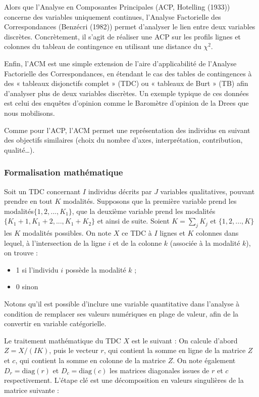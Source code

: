 \documentclass[12pt,a4paper]{reedthesis}
\providecommand{\tightlist}{%
  \setlength{\itemsep}{0pt}\setlength{\parskip}{0pt}}
\begin{document}
Alors que l'Analyse en Composantes Principales (ACP, Hotelling (1933)) concerne des variables uniquement continues, l'Analyse Factorielle des Correspondances (Benzécri (1982)) permet d'analyser le lien entre deux variables discrètes. Concrètement, il s'agit de réaliser une ACP sur les profils lignes et colonnes du tableau de contingence en utilisant une distance du \(\chi^2\).

Enfin, l'ACM est une simple extension de l'aire d'applicabilité de l'Analyse Factorielle des Correspondances, en étendant le cas des tables de contingences à des « tableaux disjonctifs complet » (TDC) ou « tableaux de Burt » (TB) afin d'analyser plus de deux variables discrètes. Un exemple typique de ces données est celui des enquêtes d'opinion comme le Baromètre d'opinion de la Drees que nous mobilisons.

Comme pour l'ACP, l'ACM permet une représentation des individus en suivant des objectifs similaires (choix du nombre d'axes, interprétation, contribution, qualité\ldots).

\hypertarget{formalisation-mathuxe9matique-1}{%
\subsubsection{Formalisation mathématique}\label{formalisation-mathuxe9matique-1}}

Soit un TDC concernant \(I\) individus décrits par \(J\) variables qualitatives, pouvant prendre en tout \(K\) modalités. Supposons que la première variable prend les modalités\(\{1,2,...,K_{1}\}\), que la deuxième variable prend les modalités \(\{K_{1}+1,K_{1}+2,...,K_{1}+K_{2}\}\) et ainsi de suite. Soient \(K=\sum _{j}K_{j}\) et \(\{1,2,...,K\}\) les \(K\) modalités possibles. On note \(X\) ce TDC à \(I\) lignes et \(K\) colonnes dans lequel, à l'intersection de la ligne \(i\) et de la colonne \(k\) (associée à la modalité \(k\)), on trouve :
\begin{itemize}
\tightlist
\item
  1 si l'individu \(i\) possède la modalité \(k\) ;
\item
  0 sinon
\end{itemize}
Notons qu'il est possible d'inclure une variable quantitative dans l'analyse à condition de remplacer ses valeurs numériques en plage de valeur, afin de la convertir en variable catégorielle.

Le traitement mathématique du TDC \(X\) est le suivant : On calcule d'abord \(Z=X/(IK)\), puis le vecteur \(r\), qui contient la somme en ligne de la matrice \(Z\) et \(c\), qui contient la somme en colonne de la matrice \(Z\). On note également \(D_{r}={\text{diag}}(r)\) et \(D_{c}={\text{diag}}(c)\) les matrices diagonales issues de \(r\) et \(c\) respectivement. L'étape clé est une décomposition en valeurs singulières de la matrice suivante :
\end{document}
